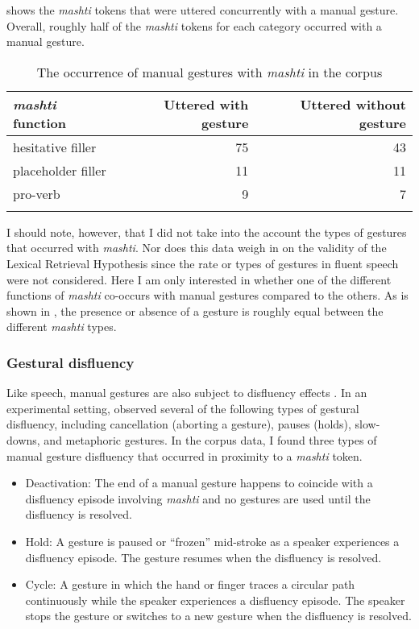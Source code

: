 \documentclass[output=paper]{langscibook}
\begin{document}
 shows the \textit{mashti} tokens that were uttered concurrently with a manual gesture. Overall, roughly half of the \textit{mashti} tokens for each category occurred with a manual gesture.

\begin{table}
\begin{tabular}{lrr}
\lsptoprule
\textit{mashti} function & Uttered with gesture & Uttered without gesture\\
\midrule
hesitative filler & 75 & 43\\
placeholder filler & 11 & 11\\
pro-verb & 9 & 7\\
\lspbottomrule
\end{tabular}
\caption{\label{tab:rice:13}The occurrence of manual gestures with \textit{mashti} in the corpus}
\end{table}

I should note, however, that I did not take into the account the types of gestures that occurred with \textit{mashti}. Nor does this data weigh in on the validity of the Lexical Retrieval Hypothesis since the rate or types of gestures in fluent speech were not considered. Here I am only interested in whether one of the different functions of \textit{mashti} co-occurs with manual gestures compared to the others. As is shown in , the presence or absence of a gesture is roughly equal between the different \textit{mashti} types. 

\subsubsection{Gestural disfluency}
\label{sec:rice:4.2.4}

Like speech, manual gestures are also subject to disfluency effects \citep{Seyfeddinipur2006}. In an experimental setting, \citet{Betz2023} observed several of the following types of gestural disfluency, including cancellation (aborting a gesture), pauses (holds), slow-downs, and metaphoric gestures. In the corpus data, I found three types of manual gesture disfluency that occurred in proximity to a \textit{mashti} token.

\begin{itemize}
\item
Deactivation: The end of a manual gesture happens to coincide with a disfluency episode involving \textit{mashti} and no gestures are used until the disfluency is resolved.

\item 
Hold: A gesture is paused or “frozen” mid-stroke as a speaker experiences a disfluency episode. The gesture resumes when the disfluency is resolved.

\item 
Cycle: A gesture in which the hand or finger traces a circular path continuously while the speaker experiences a disfluency episode. The speaker stops the gesture or switches to a new gesture when the disfluency is resolved.

\end{itemize}
\end{document}
